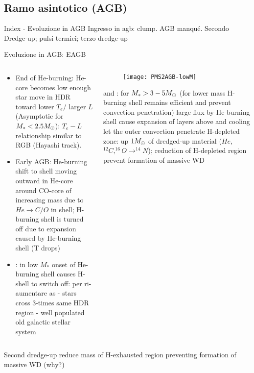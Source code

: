 \subsection{Ramo asintotico (AGB)}

\begin{frame}{Index - Evoluzione in AGB}
Ingresso in agb: clump. AGB manqu\'e. Secondo Dredge-up; pulsi termici; terzo dredge-up
\end{frame}

\begin{frame}{Evoluzione in AGB: EAGB}
\begin{columns}[T]
	\begin{column}{0.45\textwidth}
	\begin{itemize}
	\item End of He-burning: He-core becomes low enough star move in HDR toward lower $T_e$/ larger $L$ (Asymptotic for $M_*<2.5M_{\odot}$): $T_e-L$ relationship similar to RGB (Hayashi track).
	\item Early AGB: He-burning shift to shell moving outward in He-core around CO-core of increasing mass due to $He\to C/O$ in shell; H-burning shell is turned off due to expansion caused by He-burning shell (T drops)
	\item {}: in low $M_*$ onset of He-burning shell causes H-shell to switch off:  per ri-aumentare as  - stars cross 3-times same HDR region - well populated old galactic stellar system
	\end{itemize}
	\end{column}
	\begin{column}{0.50\textwidth}
	\begin{figure}[!ht]
	\texttt{[image: PMS2AGB-lowM]}\label{fig:PMS2AGB-lowM}
	\end{figure}
     and : for $M_*>3-5M_{\odot}$ (for lower mass H-burning shell remains efficient and prevent convection penetration) large flux by He-burning shell cause expansion of layers above and cooling let the outer convection penetrate H-depleted zone: up $1M_{\odot}$ of dredged-up material ($He$, $^{12}C,^{16}O\to^{14}N$); reduction of H-depleted region prevent formation of massive WD
\end{column}\end{columns}
Second dredge-up reduce mass of H-exhausted region preventing formation of massive WD (why?)
\end{frame}

